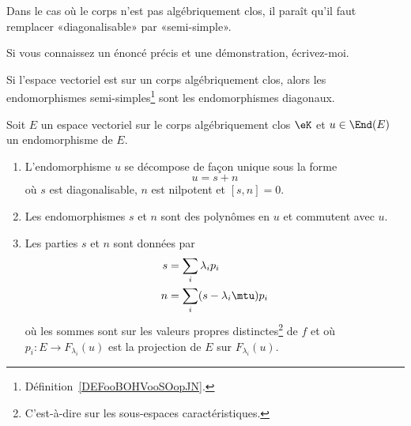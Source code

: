 \begin{probleme}
    Dans le cas où le corps n'est pas algébriquement clos, il paraît qu'il faut remplacer «diagonalisable» par «semi-simple».

    Si vous connaissez un énoncé précis et une démonstration, écrivez-moi.
\end{probleme}

Si l'espace vectoriel est sur un corps algébriquement clos, alors les endomorphismes semi-simples\footnote{Définition~\ref{DEFooBOHVooSOopJN}.} sont les endomorphismes diagonaux.


\begin{theorem} \label{ThoRURcpW}
    Soit \( E\) un espace vectoriel sur le corps algébriquement clos \( \eK\) et \( u\in\End(E)\) un endomorphisme de \( E\).

    \begin{enumerate}
        \item

            L'endomorphisme \( u\) se décompose de façon unique sous la forme
            \begin{equation}
                u=s+n
            \end{equation}
            où \( s\) est diagonalisable, \( n\) est nilpotent et \( [s,n]=0\).
        \item
            Les endomorphismes \( s\) et \( n\) sont des polynômes en \( u\) et commutent avec \( u\).
        \item   \label{ItemThoRURcpWiii}
            Les parties \( s\) et \( n\) sont données par
            \begin{subequations}
                \begin{align}
                    s&=\sum_i\lambda_ip_i\\
                    n&=\sum_i(s-\lambda_i\mtu)p_i
                \end{align}
            \end{subequations}
            où les sommes sont sur les valeurs propres distinctes\footnote{C'est-à-dire sur les sous-espaces caractéristiques.} de \( f\) et où \( p_i\colon E\to F_{\lambda_i}(u)\) est la projection de \( E\) sur \( F_{\lambda_i}(u)\).
    \end{enumerate}
\end{theorem}

